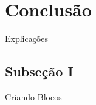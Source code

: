 \section{Conclusão}
\begin{frame}{Explicações}

\end{frame}

\subsection{Subseção I}
\begin{frame}{Criando Blocos}

\end{frame}
